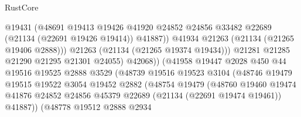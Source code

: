\begin{lexlean}{RustCore}
\begin{coremodule}
                                        @19431
                                        (@48691
                                          @19413
                                          @19426
                                          @41920
                                          @24852
                                          @24856
                                          @33482
                                          @22689
                                          (@21134 (@22691 @19426 @19414))
                                          @41887))
                                      @41934
                                      @21263
                                      (@21134 (@21265 @19406 @2888)))
                                    @21263
                                    (@21134 (@21265 @19374 @19434)))
                                  @21281
                                  @21285
                                  @21290
                                  @21295
                                  @21301
                                  @24055)
                                @42068))
                            (@41958
                              @19447
                              @2028
                              @450
                              @44
                              @19516
                              @19525
                              @2888
                              @3529
                              (@48739
                                @19516
                                @19523
                                @3104
                                (@48746
                                  @19479
                                  @19515
                                  @19522
                                  @3054
                                  @19452
                                  @2882
                                  (@48754
                                    @19479
                                    (@48760
                                      @19460
                                      @19474
                                      @41876
                                      @24852
                                      @24856
                                      @45379
                                      @22689
                                      (@21134 (@22691 @19474 @19461))
                                      @41887))
                                  (@48778
                                    @19512
                                    @2888
                                    @2934

\end{coremodule}
\end{lexlean}
